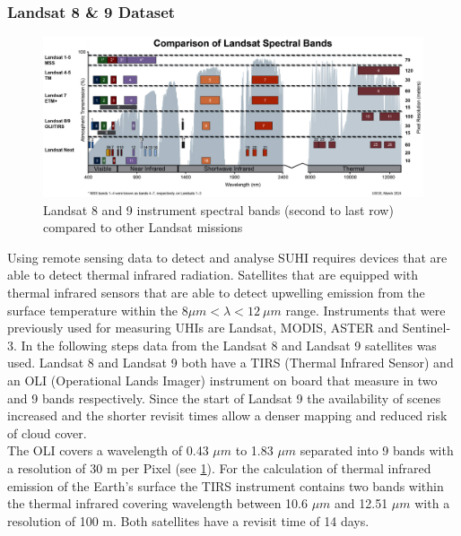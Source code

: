 \documentclass[12pt,a4paper, english,twoside]{scrartcl}
\begin{document}
    \subsubsection{Landsat 8 \& 9 Dataset}\label{sec:landsat}
      \begin{figure}[htbp]
       \begin{center}
         \includegraphics[width=\textwidth]{img/LandsatSpectralBands.png}
       \end{center}
       \caption{Landsat 8 and 9 instrument spectral bands (second to last row) compared to other Landsat missions\autocite{USGSWebsite}\label{fig:lsspectral}}
      \end{figure}
      \noindent
      Using remote sensing data to detect and analyse \gls{SUHI} requires devices that are able to detect thermal infrared radiation. 
      Satellites that are equipped with thermal infrared sensors that are able to detect upwelling emission from the surface temperature within the $ 8\mu m < \lambda < 12\ \mu m $ range. 
      Instruments that were previously used for measuring \glspl{UHI} are Landsat, MODIS, ASTER and Sentinel-3. 
      In the following steps data from the Landsat 8 and Landsat 9 satellites was used. 
      Landsat 8 and Landsat 9 both have a TIRS (Thermal Infrared Sensor) and an OLI (Operational Lands Imager) instrument on board that measure in two and 9 bands respectively.
      Since the start of Landsat 9 the availability of scenes increased and the shorter revisit times allow a denser mapping and reduced risk of cloud cover. \\ 
      The OLI covers a wavelength of 0.43 $\mu m$ to 1.83 $\mu m$ separated into 9 bands with a resolution of 30 m per Pixel (see \cref{fig:lsspectral}). 
      For the calculation of thermal infrared emission of the Earth's surface the TIRS instrument contains two bands within the thermal infrared covering wavelength between 10.6 $\mu m$ and 12.51 $\mu m$ with a resolution of 100 m.
      Both satellites have a revisit time of 14 days. 
%
\end{document}
